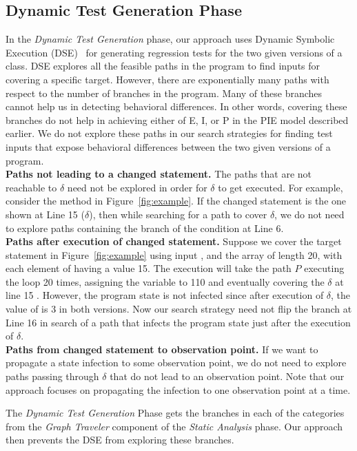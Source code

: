 \subsection{Dynamic Test Generation Phase}
In the \emph{Dynamic Test Generation} phase, our approach uses Dynamic Symbolic Execution (DSE)~\cite{dart, cute, exe} for 
generating regression tests for the two given versions of a class. DSE explores all the feasible 
paths in the program to find inputs for covering a specific target. However, there are exponentially 
many paths with respect to the number of branches in the program.
 Many of these branches cannot help us in detecting behavioral differences. 
 In other words, covering these branches do not help in achieving either of E, I, or P in the PIE model described earlier. 
 We do not explore these paths in our search strategies for finding test inputs that expose 
 behavioral differences between the two given versions of a program.
\\ \textbf{Paths not leading to a changed statement.} The paths that are not reachable to $\delta$ need not be 
explored in order for $\delta$ to get executed. For example, consider the method  in Figure~\ref{fig:example}.
 If the changed statement is the one shown at Line 15 ($\delta$), then while searching for a path 
 to cover $\delta$, we do not need to explore paths containing the  branch of the condition at Line 6.
\\ \textbf{Paths after execution of changed statement.} Suppose we cover the target statement 
in Figure~\ref{fig:example} using input , and the array  of length 20, 
with each element of  having a value 15. The execution will take the path $P$ 
executing the loop 20 times, assigning the variable  to 110 and eventually 
covering the $\delta$ at line 15 . However, the program state is not infected since 
after execution of $\delta$, the value of  is 3 in both versions. Now our 
search strategy need not flip the branch at Line 16 in search of a path that infects 
the program state just after the execution of $\delta$.
\\ \textbf{Paths from changed statement to observation point.} If we want to propagate 
a state infection to some observation point, we do not need to explore paths passing 
through $\delta$ that do not lead to an observation point. Note that our approach focuses 
on propagating the infection to one observation point at a time.



The \emph{Dynamic Test Generation} Phase gets the branches in each of the categories from the \emph{Graph Traveler} component of the \emph{Static Analysis} phase. Our approach then prevents the DSE from exploring these branches.


 
 